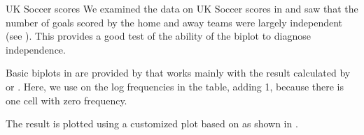 \documentclass[11pt]{book}
\renewenvironment{knitrout}{\small\renewcommand{\baselinestretch}{.85}}{} %
\begin{document}
\begin{Example}[soccer3]{UK Soccer scores}
We examined the data on UK Soccer scores in 
and saw that the number of goals scored by the home and away teams
were largely independent (see ).
This \Dset provides a good test of the ability of the biplot
to diagnose independence.

\begin{knitrout}
\color{fgcolor}\begin{kframe}
\begin{alltt}
\hlstd{(}\hlstd{,} \hlstd{=}\hlstd{)}
 \hlkwb{<-} \hlstd{(}\hlstd{=}\hlstd{(}\hlstd{,} \hlopt{:}\hlstd{),}
                           \hlstd{=}\hlstd{(}\hlstd{,} \hlopt{:}\hlstd{))}
\end{alltt}
\end{kframe}
\end{knitrout}
Basic biplots in \R are provided by  that works mainly with
the result calculated by  or .
Here, we use  on the log frequencies in the
 table, adding 1, because there is one cell
with zero frequency.

\begin{knitrout}
\color{fgcolor}\begin{kframe}
\begin{alltt}
 \hlkwb{<-} \hlstd{(}\hlopt{+}\hlstd{),} \hlstd{=}\hlstd{,} \hlstd{=}\hlstd{)}
\end{alltt}
\end{kframe}
\end{knitrout}
The result is plotted using a customized plot based on 
as shown in .

\begin{knitrout}
\color{fgcolor}\begin{kframe}
\begin{alltt}
 \hlstd{=}\hlstd{,} \hlstd{=}\hlstd{,}
  \hlstd{=}\hlstd{(}\hlstd{,} \hlstd{),} \hlstd{=}\hlstd{,} \hlstd{=}\hlstd{,}
  \hlstd{=}\hlstd{,} \hlstd{=}\hlstd{)}
\end{alltt}
\end{kframe}\begin{figure}[!htb]



\end{figure}
\end{knitrout}
\end{Example}
\end{document}
